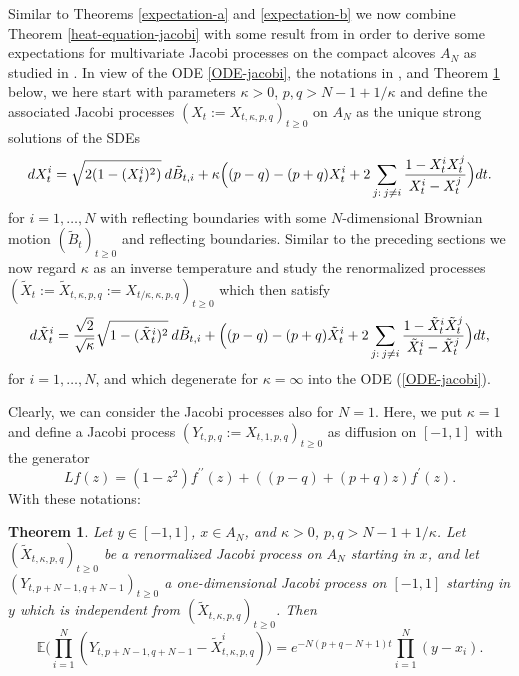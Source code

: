 \documentclass[reqno]{amsart}
\theoremstyle{plain}
\newtheorem{theorem}{Theorem}[section]
\theoremstyle{definition}
\numberwithin{equation}{section}
\begin{document}
 Similar to Theorems \ref{expectation-a} and \ref{expectation-b} we now combine Theorem \ref{heat-equation-jacobi} with some result from
 \cite{V2}
in order to derive some expectations for multivariate Jacobi  processes on the compact alcoves $A_N$
as studied in \cite{De, RR, Do, AVW, V2, V3}. In view of the ODE \ref{ODE-jacobi}, the notations in \cite{V2}, and
Theorem \ref{expectation-jacobi} below, we here start with parameters
$\kappa>0$, $p,q>N-1+1/\kappa$
and define the associated Jacobi  processes  $(X_t:=X_{t,\kappa,p,q})_{t\ge0}$ on $A_N$ as the unique strong solutions
 of the SDEs
 \begin{equation}\label{SDE-jacobi}
   dX_{t}^i  =\sqrt{2(1-(X_{t}^i)^2)}\> d\tilde B_{t,i} +
\kappa\Bigl((p-q) -(p+q)X_{t}^i +
2\sum_{j: \> j\ne i}\frac{1-X_{t}^iX_{t}^j}{X_{t}^i-X_{t}^j}\Bigr)dt.
\end{equation}
for $i=1,\ldots,N$ with reflecting boundaries with some $N$-dimensional Brownian motion $(\tilde B_t)_{t\ge0}$ 
and reflecting boundaries.
Similar to the preceding sections we now regard $\kappa$ as an inverse temperature and study the
renormalized processes $(\tilde X_{t}:=\tilde X_{t,\kappa,p,q}:=X_{t/\kappa,\kappa,p,q})_{t\ge0}$  which then satisfy
\begin{equation}\label{SDE-jacobi-renormalized}
   d\tilde X_{t}^i  =\frac{\sqrt 2}{\sqrt\kappa } \sqrt{1-(\tilde X_{t}^i)^2}\> d\tilde B_{t,i} +
\Bigl((p-q) -(p+q)\tilde X_{t}^i +
2\sum_{j: \> j\ne i}\frac{1-\tilde X_{t}^i\tilde X_{t}^j}{\tilde X_{t}^i-\tilde X_{t}^j}\Bigr)dt,
\end{equation}
for $i=1,\ldots,N$, and which degenerate for $\kappa=\infty$ into the ODE (\ref{ODE-jacobi}).

Clearly, we can consider the Jacobi processes also for $N=1$. Here, we put  $\kappa=1$  and define a
Jacobi process $(Y_{t,p,q}:=X_{t,1,p,q})_{t\ge0}$ as diffusion on $[-1,1]$ with the generator
\begin{equation}Lf(z)=(1-z^2)f^{\prime\prime}(z)+((p-q)+(p+q)z)f^{\prime}(z).\end{equation}
With these notations:

\begin{theorem}\label{expectation-jacobi}
  Let $y\in [-1,1]$, $x\in A_N$, and $\kappa>0$, $p,q>N-1+1/\kappa$.
Let  $(\tilde X_{t,\kappa,p,q})_{t\ge0}$ be a renormalized Jacobi process on $A_N$
starting in $x$, and  let \\ $(Y_{t,p+N-1,q+N-1})_{t\ge0}$ a one-dimensional Jacobi process  on $[-1,1]$ starting in $y$ which is independent from
 $(\tilde X_{t,\kappa,p,q})_{t\ge0}$. Then
\begin{equation}\label{equ-expectation-jacobi}
\mathbb E\biggl(\prod_{i=1}^N (  Y_{t,p+N-1,q+N-1}- \tilde X_{t,\kappa,p,q}^i)\biggr)= e^{- N(p+q-N+1)t}\prod_{i=1}^N (y- x_i).
\end{equation}
\end{theorem}
\end{document}
